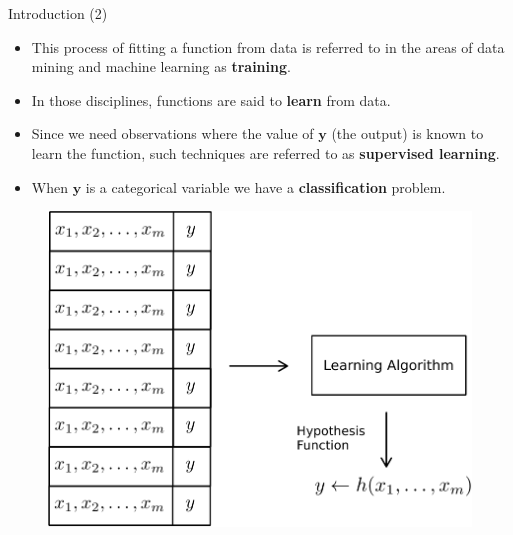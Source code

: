 \documentclass[handout]{beamer}
\begin{document}
\begin{frame}{Introduction (2)}
\scriptsize{
\begin{itemize}
 
 \item This process of fitting a function from data is referred to in the areas of data mining and machine learning as \textbf{training}.

 \item In those disciplines, functions are said to \textbf{learn} from data.
 
 \item Since we need observations where the value of $\mathbf{y}$ (the output) is known to learn the function, such techniques are referred to as \textbf{supervised learning}.
 
 \item When $\mathbf{y}$ is a categorical variable we have a \textbf{classification} problem. 
 

 
\end{itemize}


\begin{figure}[h!]
	\centering
	\includegraphics[scale=0.4]{pics/learning.pdf}
\end{figure}

} 
 
\end{frame}
\end{document}
